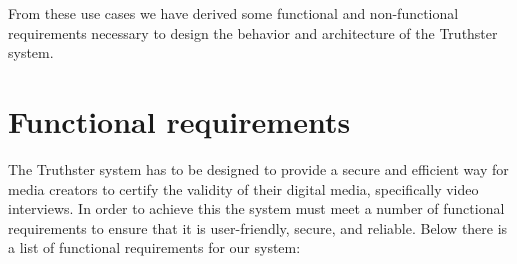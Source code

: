 \documentclass[target=mst,aauheader=]{thud}
\begin{document}
From these use cases we have derived some functional and non-functional requirements necessary to design the behavior and architecture of the Truthster system.\\

\section{Functional requirements}

The Truthster system has to be designed to provide a secure and efficient way for media creators to certify the validity of their digital media, specifically video interviews. In order to achieve this the system must meet a number of functional requirements to ensure that it is user-friendly, secure, and reliable. 
Below there is a list of functional requirements for our system:
\end{document}
